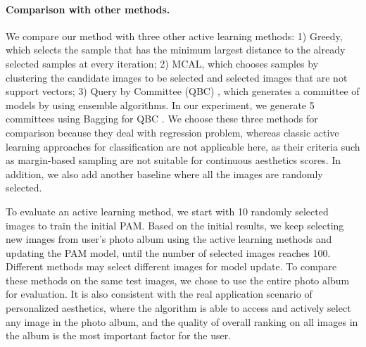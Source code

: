 


\paragraph{Comparison with other methods.} We compare our method with three other active learning methods: 1) Greedy\cite{yu2010passive}, which selects the sample that has the minimum largest distance to the already selected samples at every iteration;  2) MCAL\cite{demir2014multiple}, which chooses samples by clustering the candidate images to be selected and selected images that are not support vectors;  3) Query by Committee (QBC) \cite{burbidge2007active}, which generates a committee of models by using ensemble algorithms. In our experiment, we generate 5 committees using Bagging for QBC \cite{mamitsuka1998query}. We choose these three methods for comparison because they deal with regression problem, whereas classic active learning approaches\cite{tong2001support1, demir2014multiple} for classification are not applicable here, as their criteria such as margin-based sampling are not suitable for continuous aesthetics scores. In addition, we also add another baseline where all the images are randomly selected.

To evaluate an active learning method, we start with 10 randomly selected images to train the initial PAM. Based on the initial results, we keep selecting new images from user's photo album using the active learning methods and updating the PAM model, until the number of selected images reaches 100. Different methods may select different images for model update. To compare these methods on the same test images, we chose to use the entire photo album for evaluation. It is also consistent with the real application scenario of personalized aesthetics, where the algorithm is able to access and actively select any image in the photo album, and the quality of overall ranking on all images in the album is the most important factor for the user.

